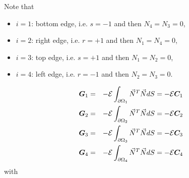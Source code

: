 Note that 
\begin{itemize}
\item $i=1$: bottom edge, i.e. $s=-1$ and then $N_4=N_3=0$,
\item $i=2$: right  edge, i.e.  $r=+1$ and then $N_1=N_4=0$,
\item $i=3$: top edge, i.e. $s=+1$  and then $N_1=N_2=0$,
\item $i=4$: left edge, i.e. $r=-1$ and then $N_2=N_3=0$.
\end{itemize}


\begin{eqnarray}
{\bm G}_1 &=& -  {\cal{E}} \int_{\partial\Omega_1} \vec{N}^T \vec{N} dS = -  {\cal{E}} {\bm C}_1 \nonumber\\
{\bm G}_2 &=& -  {\cal{E}} \int_{\partial\Omega_2} \vec{N}^T \vec{N} dS = -  {\cal{E}} {\bm C}_2 \nonumber\\
{\bm G}_3 &=& -  {\cal{E}} \int_{\partial\Omega_3} \vec{N}^T \vec{N} dS = -  {\cal{E}} {\bm C}_3 \nonumber\\
{\bm G}_4 &=& -  {\cal{E}} \int_{\partial\Omega_4} \vec{N}^T \vec{N} dS = -  {\cal{E}} {\bm C}_4 \nonumber\\
\end{eqnarray}
with 
